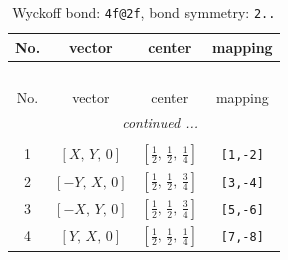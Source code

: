 \documentclass[fleqn,8pt]{jsarticle}
\begin{document}
\renewcommand{\arraystretch}{1.2}
\begin{longtable}{cccc}
\caption{Wyckoff bond: {\tt 4f@2f}, bond symmetry: {\tt 2..}}
 \\
 \hline \hline
No. & vector & center & mapping \\ \hline \endfirsthead

\multicolumn{3}{l}{\tablename\ \thetable{}} \\
 \hline \hline
No. & vector & center & mapping \\ \hline \endhead

 \hline \hline
\multicolumn{3}{r}{\footnotesize\it continued ...} \\ \endfoot

 \hline \hline
\multicolumn{3}{r}{} \\ \endlastfoot

1 & $\left[ X,\, Y,\, 0 \right]$ & $\left[ \frac{1}{2},\, \frac{1}{2},\, \frac{1}{4} \right]$ & {\tt [1,-2]} \\ \hline
2 & $\left[ - Y,\, X,\, 0 \right]$ & $\left[ \frac{1}{2},\, \frac{1}{2},\, \frac{3}{4} \right]$ & {\tt [3,-4]} \\ \hline
3 & $\left[ - X,\, Y,\, 0 \right]$ & $\left[ \frac{1}{2},\, \frac{1}{2},\, \frac{3}{4} \right]$ & {\tt [5,-6]} \\ \hline
4 & $\left[ Y,\, X,\, 0 \right]$ & $\left[ \frac{1}{2},\, \frac{1}{2},\, \frac{1}{4} \right]$ & {\tt [7,-8]} \\
\end{longtable}
\renewcommand{\arraystretch}{1.2}
\end{document}
